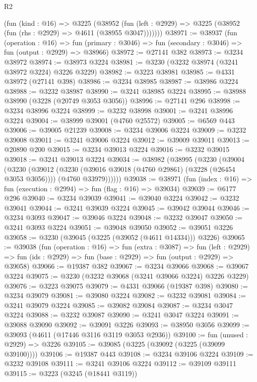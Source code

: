 \begin{lexlean}{R2}
\begin{coremodule}
      (fun (kind : @16) =>
      @3225
        (@38952
          (fun (left : @2929) => @3225 (@38952 (fun (rhs : @2929) => @4611 (@38955 @3047)))))))
@38971 := @38937
    (fun (operation : @16) =>
    fun (primary : @3046) => fun (secondary : @3046) => fun (output : @2929) => @38966)
@38972 := @27141 @382
@38973 := @3234 @38972
@38974 := @38973 @3224
@38981 := @3230 (@3232 @38974 (@3241 @38972 @3224) @3226 @3229)
@38982 := @3223 @38981
@38985 := @4331 @38972 (@27141 @398)
@38986 := @3234 @38985
@38987 := @38986 @3224
@38988 := @3232 @38987
@38990 := @3241 @38985 @3224
@38995 := @38988 @38990 (@3228 (@20749 @3053 @3056))
@38996 := @27141 @296
@38998 := @3234 @38996 @3224
@38999 := @3232 @38998
@39001 := @3241 @38996 @3224
@39004 := @38999 @39001 (@4760 @25572)
@39005 := @6569 @443
@39006 := @39005 @21239
@39008 := @3234 @39006 @3224
@39009 := @3232 @39008
@39011 := @3241 @39006 @3224
@39012 := @39009 @39011
@39013 := @20890 @200
@39015 := @3234 @39013 @3224
@39016 := @3232 @39015
@39018 := @3241 @39013 @3224
@39034 := @38982
    (@38995
      (@3230
        (@39004
          (@3230
            (@39012
              (@3230 (@39016 @39018 (@4760 @29861) (@3228 (@26454 @3053 @3056))))
              (@4760 @33979))))))
@39038 := @38971 (fun (index : @16) => fun (execution : @2994) => fun (flag : @16) => @39034)
@39039 := @6177 @296
@39040 := @3234 @39039
@39041 := @39040 @3224
@39042 := @3232 @39041
@39044 := @3241 @39039 @3224
@39045 := @39042 @39044
@39046 := @3234 @3093
@39047 := @39046 @3224
@39048 := @3232 @39047
@39050 := @3241 @3093 @3224
@39051 := @39048 @39050
@39052 := @39051 @3226
@39058 := @3230 (@39045 (@3225 (@39052 (@4611 @14334))) @3226)
@39065 := @39038
    (fun (operation : @16) =>
    fun (extra : @3087) =>
    fun (left : @2929) => fun (ids : @2929) => fun (base : @2929) => fun (output : @2929) => @39058)
@39066 := @19387 @382
@39067 := @3234 @39066
@39068 := @39067 @3224
@39075 := @3230 (@3232 @39068 (@3241 @39066 @3224) @3226 @3229)
@39076 := @3223 @39075
@39079 := @4331 @39066 (@19387 @398)
@39080 := @3234 @39079
@39081 := @39080 @3224
@39082 := @3232 @39081
@39084 := @3241 @39079 @3224
@39085 := @39082 @39084
@39087 := @3234 @3047 @3224
@39088 := @3232 @39087
@39090 := @3241 @3047 @3224
@39091 := @39088 @39090
@39092 := @39091 @3226
@39093 := @38950 @3056
@39099 := @39093 (@4611 (@17446 @3116 @3119 @3053 @2936))
@39100 := fun (unused : @2929) => @3226
@39105 := @39085 (@3225 (@39092 (@3225 (@39099 @39100))))
@39106 := @19387 @443
@39108 := @3234 @39106 @3224
@39109 := @3232 @39108
@39111 := @3241 @39106 @3224
@39112 := @39109 @39111
@39115 := @3223 (@3245 (@18441 @3119))

\end{coremodule}
\end{lexlean}
